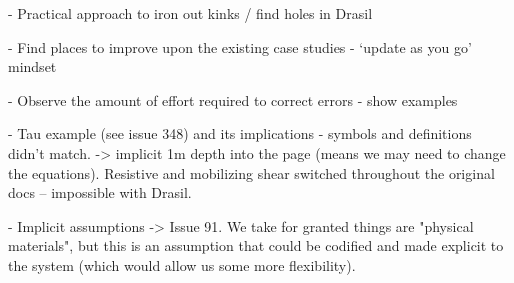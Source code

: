   - Practical approach to iron out kinks / find holes in Drasil

  - Find places to improve upon the existing case studies - ‘update as you go’ 
  mindset

  - Observe the amount of effort required to correct errors - show examples

  - Tau example (see issue 348) and its implications - symbols and definitions 
  didn't match. -> implicit 1m depth into the page (means we may need to change 
  the equations). Resistive and mobilizing shear switched throughout the 
  original docs -- impossible with Drasil.

  -  Implicit assumptions -> 
  Issue 91. We take for granted things are "physical 
  materials", but this is an assumption that could be codified and made 
  explicit to the system (which would allow us some more flexibility).